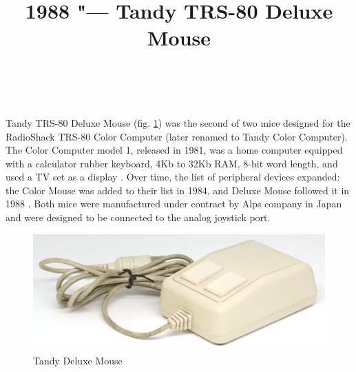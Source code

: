 \documentclass[11pt, a4paper]{article}
\begin{document}
\title{1988 "--- Tandy TRS-80 Deluxe Mouse}
\date{}
\author{~}
\maketitle
{}

Tandy TRS-80 Deluxe Mouse (fig. \ref{fig:TandyDeluxeMousePic}) was the second of two mice designed for the RadioShack TRS-80 Color Computer (later renamed to Tandy Color Computer). The Color Computer model 1, released in 1981, was a home computer equipped with a calculator rubber keyboard, 4Kb to 32Kb RAM, 8-bit word length, and used a TV set as a display \cite{wiki}. Over time, the list of peripheral devices expanded: the Color Mouse was added to their list in 1984, and Deluxe Mouse followed it in 1988 \cite{adv}. Both mice were manufactured under contract by Alps company in Japan and were designed to be connected to the analog joystick port.

\begin{figure}[h]
   \centering
\includegraphics[scale=0.7]{1988_tandy_trs80_deluxe_mouse/pic_30.jpg}
    \caption{Tandy Deluxe Mouse}
    \label{fig:TandyDeluxeMousePic}
\end{figure}
\end{document}
